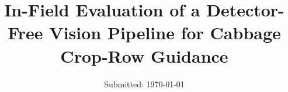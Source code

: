 
\title{\vspace{-15mm}\fontsize{21pt}{10pt}\selectfont\textbf{In-Field Evaluation of a Detector-Free Vision Pipeline for Cabbage Crop-Row Guidance}}

	\date{Submitted: \usvardate\today}

\makeatletter
\renewcommand{\@maketitle}{
\newpage
 \null
 \vskip 2em%
 \begin{center}%
  {\LARGE \@title \par}%
 \end{center}%
 \par} \makeatother
